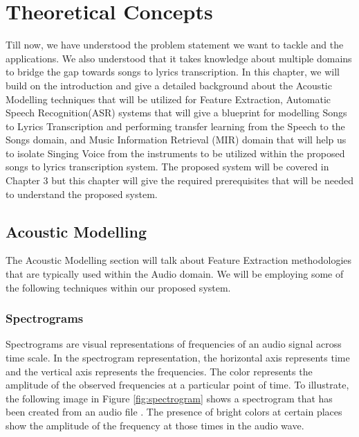 
\chapter{Theoretical Concepts}%
\label{sec:fundamentals}

Till now, we have understood the problem statement we want to tackle and the applications. We also understood that it takes knowledge about multiple domains to bridge the gap towards songs to lyrics transcription. In this chapter, we will build on the introduction and give a detailed background about the Acoustic Modelling techniques that will be utilized for Feature Extraction, Automatic Speech Recognition(ASR) systems that will give a blueprint for modelling Songs to Lyrics Transcription and performing transfer learning from the Speech to the Songs domain, and Music Information Retrieval (MIR) domain that will help us to isolate Singing Voice from the instruments to be utilized within the proposed songs to lyrics transcription system. The proposed system will be covered in Chapter 3 but this chapter will give the required prerequisites that will be needed to understand the proposed system. 

\section{Acoustic Modelling}%
\label{sec:acousticmodelling}

The Acoustic Modelling section will talk about Feature Extraction methodologies that are typically used within the Audio domain. We will be employing some of the following techniques within our proposed system. 

\subsection{Spectrograms}%
\label{sec:spectrograms}

Spectrograms are visual representations of frequencies of an audio signal across time scale. In the spectrogram representation, the horizontal axis represents time and the vertical axis represents the frequencies. The color represents the amplitude of the observed frequencies at a particular point of time. To illustrate, the following image in Figure \ref{fig:spectrogram} shows a spectrogram that has been created from an audio file  \cite{mcfee2015librosa}  . The presence of bright colors at certain places show the amplitude of the frequency at those times in the audio wave. 

